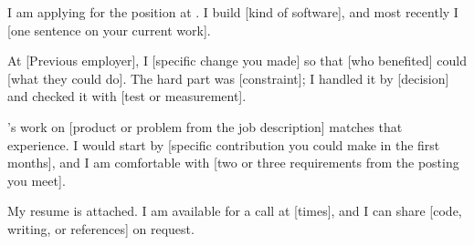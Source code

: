 \documentclass{resume}
\begin{document}



\begin{letterbody}
I am applying for the \Role position at \Company. I build [kind of software], and most recently I [one sentence on your current work].

At [Previous employer], I [specific change you made] so that [who benefited] could [what they could do]. The hard part was [constraint]; I handled it by [decision] and checked it with [test or measurement].

\Company's work on [product or problem from the job description] matches that experience. I would start by [specific contribution you could make in the first months], and I am comfortable with [two or three requirements from the posting you meet].

My resume is attached. I am available for a call at [times], and I can share [code, writing, or references] on request.
\end{letterbody}

\end{document}
